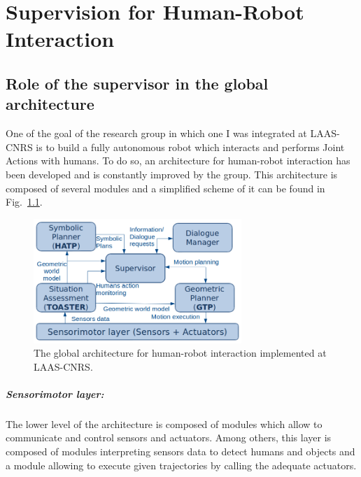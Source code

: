 \documentclass[english,a4paper,11pt,twoside]{StyleThese}
\begin{document}
\setcounter{chapter}{1} %
\dominitoc
\faketableofcontents
\fi

\chapter{Supervision for Human-Robot Interaction}
\minitoc

\label{ch:Sup}

\section{Role of the supervisor in the global architecture}

\label{sec:globalArchi}

One of the goal of the research group in which one I was integrated at LAAS-CNRS is to build a fully autonomous robot which interacts and performs Joint Actions with humans. To do so, an architecture for human-robot interaction has been developed and is constantly improved by the group. This architecture is composed of several modules and a simplified scheme of it can be found in Fig.~\ref{fig:GlobalArchi}.

\begin{figure}[!h]
	\centering
    \includegraphics[width=0.7\textwidth]{figs/Chapter2/archiGlobal.png}
    \caption{The global architecture for human-robot interaction implemented at LAAS-CNRS.}
    \label{fig:GlobalArchi}
\end{figure}

\paragraph{Sensorimotor layer:}
The lower level of the architecture is composed of modules which allow to communicate and control sensors and actuators. Among others, this layer is composed of modules interpreting sensors data to detect humans and objects and a module allowing to execute given trajectories by calling the adequate actuators.
\end{document}
